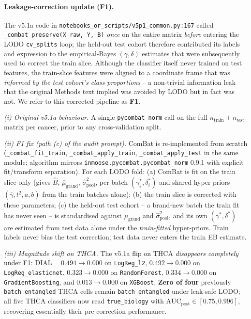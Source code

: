 \documentclass[11pt,a4paper]{article}
\begin{document}
\paragraph{Leakage-correction update (F1).}
The v5.1a code in \texttt{notebooks\_or\_scripts/v5p1\_common.py:167}
called \texttt{\_combat\_preserve(X\_raw, Y, B)} \emph{once} on the
entire matrix \emph{before} entering the LODO \texttt{cv\_splits} loop;
the held-out test cohort therefore contributed its labels and
expression to the empirical-Bayes $(\gamma, \delta)$ estimates that
were subsequently used to correct the train slice. Although the
classifier itself never trained on test features, the train-slice
features were aligned to a coordinate frame that was \emph{informed by
the test cohort's class proportions} -- a non-trivial information leak
that the original Methods text implied was avoided by LODO but in fact
was not. We refer to this corrected pipeline as \textbf{F1}.

\textit{(i) Original v5.1a behaviour.} A single
\texttt{pycombat\_norm} call on the full $n_{\mathrm{train}} +
n_{\mathrm{test}}$ matrix per cancer, prior to any cross-validation
split.

\textit{(ii) F1 fix (path (c) of the audit prompt).} ComBat is
re-implemented from scratch (\texttt{\_combat\_fit\_train},
\texttt{\_combat\_apply\_train}, \texttt{\_combat\_apply\_test} in the
same module; algorithm mirrors \texttt{inmoose.pycombat.pycombat\_norm}
0.9.1 with explicit fit/transform separation). For each LODO fold:
(a) ComBat is fit on the train slice only (gives $\hat B$,
$\bar\mu_{\mathrm{grand}}$, $\hat\sigma^{2}_{\mathrm{pool}}$,
per-batch $(\gamma^{*}_{i}, \delta^{*}_{i})$ and shared hyper-priors
$(\bar\gamma, t^{2}, a, b)$ from the train batches alone);
(b) the train slice is corrected with these parameters;
(c) the held-out test cohort -- a brand-new batch the train fit has
never seen -- is standardised against $\bar\mu_{\mathrm{grand}}$ and
$\hat\sigma^{2}_{\mathrm{pool}}$, and its own $(\gamma^{*},
\delta^{*})$ are estimated from test data alone under the
\emph{train-fitted} hyper-priors. Train labels never bias the test
correction; test data never enters the train EB estimate.

\textit{(iii) Magnitude shift on THCA.} The v5.1a flip on THCA
\emph{disappears completely} under F1: $\mathrm{DIAL} = 0.494
\to 0.000$ on \texttt{LogReg\_l2}, $0.492 \to 0.000$ on
\texttt{LogReg\_elasticnet}, $0.323 \to 0.000$ on \texttt{RandomForest},
$0.334 \to 0.000$ on \texttt{GradientBoosting}, and $0.013 \to 0.000$
on \texttt{XGBoost}. \textbf{Zero of four} previously
\texttt{batch\_entangled} THCA cells remain \texttt{batch\_entangled}
under leak-safe LODO; all five THCA classifiers now read
\texttt{true\_biology} with $\mathrm{AUC}_{\mathrm{post}} \in [0.75,
0.996]$, recovering essentially their pre-correction performance.
\end{document}
